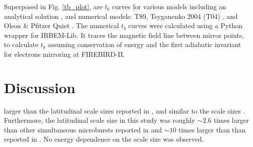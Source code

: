 \documentclass[draft, linenumbers]{agujournal}
\begin{document}
Superposed in Fig. \ref{tb_plot}, are $t_b$ curves for various models including an analytical solution  \citep{Schulz1974}, and numerical models: T89, Tsyganenko 2004 (T04) \citep{Tsyganenko2005}, and Olson \& Pfitzer Quiet \citep{Olson1982}. The numerical $t_b$ curves were calculated using a Python wrapper for IRBEM-Lib. It traces the magnetic field line between mirror points, to calculate $t_b$ assuming conservation of energy and the first adiabatic invariant for electrons mirroring at FIREBIRD-II. 

\section{Discussion} \label{discussion}
  larger than the latitudinal scale sizes  reported in \citet{Blake1996}, and similar to the scale sizes  \citep{Parks1967}. Furthermore, the latitudinal scale size in this study was roughly $\sim 2.6$ times larger than other simultaneous microbursts reported in \citet{Crew2016} and $\sim 10$ times larger than than reported in \citet{Dietrich2010}. No energy dependence on the scale size was observed.
\end{document}
